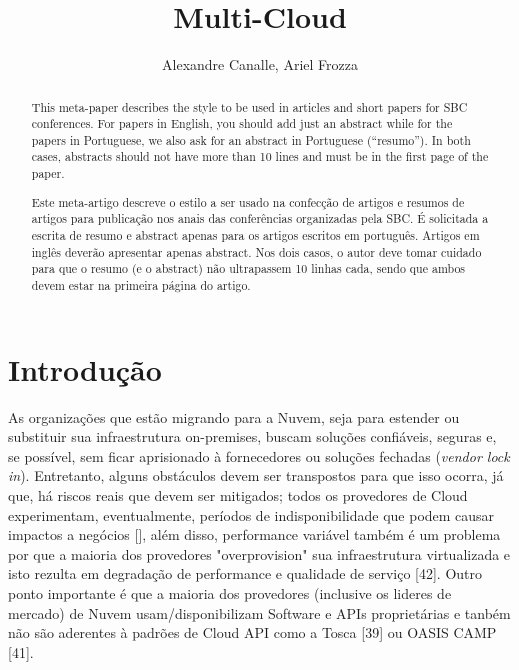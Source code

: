 \documentclass[12pt]{article}
\title{Multi-Cloud}
\author{Alexandre Canalle\inst{1}, Ariel Frozza\inst{1}}
\begin{document}

\singlespacing

\maketitle
	
\begin{abstract}
	This meta-paper describes the style to be used in articles and short papers
	for SBC conferences. For papers in English, you should add just an abstract
	while for the papers in Portuguese, we also ask for an abstract in
	Portuguese (``resumo''). In both cases, abstracts should not have more than
	10 lines and must be in the first page of the paper.
\end{abstract}

\begin{abstract} 
	Este meta-artigo descreve o estilo a ser usado na confecção de artigos e
	resumos de artigos para publicação nos anais das conferências organizadas
	pela SBC. É solicitada a escrita de resumo e abstract apenas para os artigos
	escritos em português. Artigos em inglês deverão apresentar apenas abstract.
	Nos dois casos, o autor deve tomar cuidado para que o resumo (e o abstract)
	não ultrapassem 10 linhas cada, sendo que ambos devem estar na primeira
	página do artigo.
\end{abstract}

	\section{Introdução}
		As organizações que estão migrando para a Nuvem, seja para estender ou substituir sua infraestrutura on-premises, buscam soluções confiáveis, seguras e, se possível, sem ficar aprisionado à fornecedores ou soluções fechadas (\textit{vendor lock in}). Entretanto, alguns obstáculos devem ser transpostos para que isso ocorra, já que, há riscos reais que devem ser mitigados; todos os provedores de Cloud experimentam, eventualmente, períodos de indisponibilidade que podem causar impactos a negócios [], além disso,  performance variável também é um problema por que a maioria dos provedores "overprovision" sua infraestrutura virtualizada e isto rezulta em degradação de performance e qualidade de serviço [42]. Outro ponto importante é que a maioria dos provedores (inclusive os lideres de mercado) de Nuvem usam/disponibilizam Software e APIs proprietárias e tanbém não são aderentes à padrões de Cloud API como a Tosca [39] ou OASIS CAMP [41].
		
\end{document}
